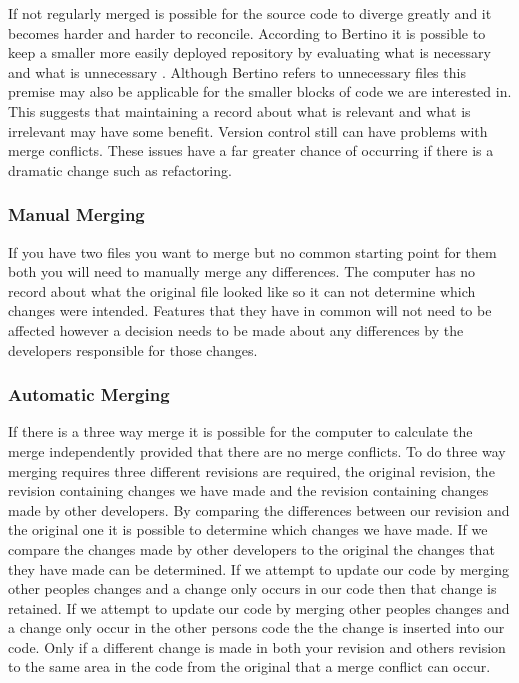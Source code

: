 If not regularly merged is possible for the source code to diverge greatly and it becomes harder and harder to reconcile.
 According to Bertino it is possible to keep a smaller more easily deployed repository by evaluating what is necessary and what is unnecessary \cite{Bertino2012}. Although Bertino refers to unnecessary files this premise may also be applicable for the smaller blocks of code we are interested in. This suggests that maintaining a record about what is relevant and what is irrelevant may have some benefit. Version control still can have problems with merge conflicts. These issues have a far greater chance of occurring if there is a dramatic change such as refactoring.
 
\subsubsection{Manual Merging}
If you have two files you want to merge but no common starting point for them both you will need to manually merge any differences.  The computer has no record about what the original file looked like so it can not determine which changes were intended.  Features that they have in common will not need to be affected however a decision needs to be made about any differences by the developers responsible for those changes.


\subsubsection{Automatic Merging}
If there is a three way merge it is possible for the computer to calculate the merge independently provided that there are no merge conflicts.
To do three way merging requires three different revisions are required, the original revision, the revision containing changes we have made and the revision containing changes made by other developers. By comparing the differences between our revision and the original one it is possible to determine which changes we have made.  If we compare the changes made by other developers to the original the changes that they have made can be determined.  If we attempt to update our code by merging other peoples changes and a change only occurs in our code then that change is retained.  If we attempt to update our code by merging other peoples changes and a change only occur in the other persons code the the change is inserted into our code. Only if a different change is made in both your revision and others revision to the same area in the code from the original that a merge conflict can occur. 


